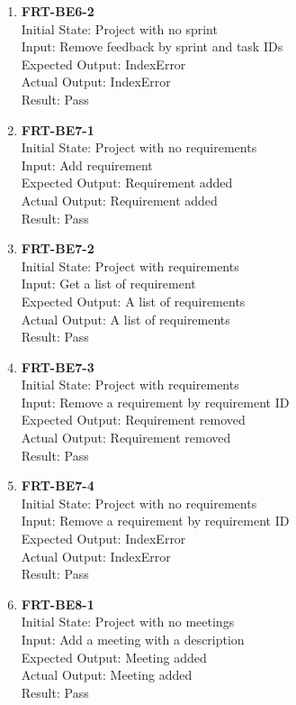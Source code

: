 \documentclass[12pt, titlepage]{article}
\begin{document}
\begin{enumerate}
    \item{\textbf{FRT-BE6-2}}\\
    Initial State: Project with no sprint\\
    Input: Remove feedback by sprint and task IDs\\
    Expected Output: IndexError\\
    Actual Output: IndexError\\
    Result: Pass
    
    \item{\textbf{FRT-BE7-1}}\\
    Initial State: Project with no requirements\\
    Input: Add requirement\\
    Expected Output: Requirement added\\
    Actual Output: Requirement added\\
    Result: Pass
    
    \item{\textbf{FRT-BE7-2}}\\
    Initial State: Project with requirements\\
    Input: Get a list of requirement\\
    Expected Output: A list of requirements\\
    Actual Output: A list of requirements\\
    Result: Pass
    
    \item{\textbf{FRT-BE7-3}}\\
    Initial State: Project with requirements\\
    Input: Remove a requirement by requirement ID\\
    Expected Output: Requirement removed\\
    Actual Output: Requirement removed\\
    Result: Pass
    
    \item{\textbf{FRT-BE7-4}}\\
    Initial State: Project with no requirements\\
    Input: Remove a requirement by requirement ID\\
    Expected Output: IndexError\\
    Actual Output: IndexError\\
    Result: Pass
    
    \item{\textbf{FRT-BE8-1}}\\
    Initial State: Project with no meetings\\
    Input: Add a meeting with a description\\
    Expected Output: Meeting added\\
    Actual Output: Meeting added\\
    Result: Pass
    

\end{enumerate}
\end{document}
